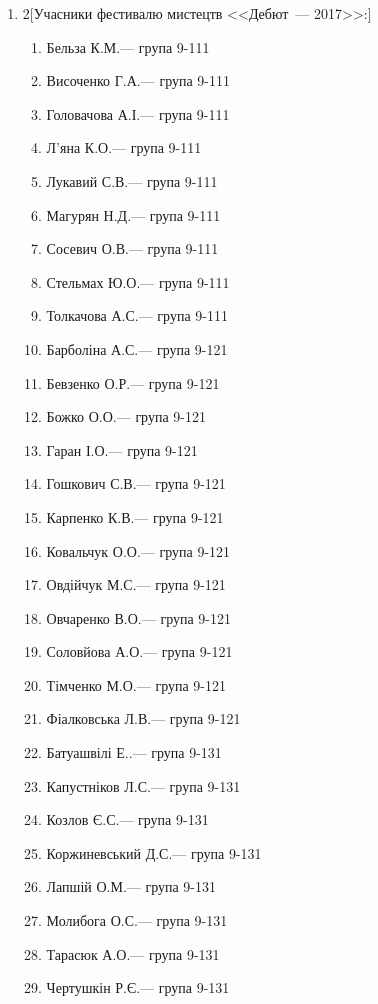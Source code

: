 \documentclass[
	a4paper,
	12pt,
	oneside,
	draft
]{extreport}
\begin{document}
{\begin{enumerate}[label=\Roman*.]
\item \begin{multicols}{2}[Учасники фестивалю мистецтв <<Дебют~--- 2017>>:]
\begin{enumerate}[topsep=0pt,itemsep=-1ex,partopsep=1ex,parsep=1ex,label=\arabic*.]
\item Бельза К.М.\hfill --- група 9-111
\item Височенко Г.А.\hfill --- група 9-111
\item Головачова А.І.\hfill --- група 9-111
\item Л’яна К.О.\hfill --- група 9-111
\item Лукавий С.В.\hfill --- група 9-111
\item Магурян Н.Д.\hfill --- група 9-111
\item Сосевич О.В.\hfill --- група 9-111
\item Стельмах Ю.О.\hfill --- група 9-111
\item Толкачова А.С.\hfill --- група 9-111
\item Барболіна А.С.\hfill --- група 9-121
\item Бевзенко О.Р.\hfill --- група 9-121
\item Божко О.О.\hfill --- група 9-121
\item Гаран І.О.\hfill --- група 9-121
\item Гошкович С.В.\hfill --- група 9-121
\item Карпенко К.В.\hfill --- група 9-121
\item Ковальчук О.О.\hfill --- група 9-121
\item Овдійчук М.С.\hfill --- група 9-121
\item Овчаренко В.О.\hfill --- група 9-121
\item Соловйова А.О.\hfill --- група 9-121
\item Тімченко М.О.\hfill --- група 9-121
\item Фіалковська Л.В.\hfill --- група 9-121
\item Батуашвілі Е..\hfill --- група 9-131
\item Капустніков Л.С.\hfill --- група 9-131
\item Козлов Є.С.\hfill --- група 9-131
\item Коржиневський Д.С.\hfill --- група 9-131
\item Лапшій О.М.\hfill --- група 9-131
\item Молибога О.С.\hfill --- група 9-131
\item Тарасюк А.О.\hfill --- група 9-131
\item Чертушкін Р.Є.\hfill --- група 9-131

\end{enumerate}
\end{multicols}
\end{enumerate}}
\end{document}
